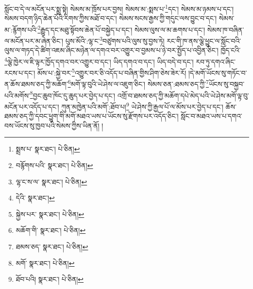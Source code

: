 སློང་བ་དེ་ལ་མངོན་པར་སྨྲ་སྟེ། སེམས་མ་ཁྲོས་པར་བྱས། སེམས་མ་:སྨས་པ་\footnote{སྨྲས་པ་  སྣར་ཐང་།  པེ་ཅིན། }དང་། སེམས་མ་ཉམས་པ་དང་། སེམས་བདག་ཉིད་ཆེན་པོའི་རིགས་ཀྱིས་མཐོ་བ་དང་། སེམས་སངས་རྒྱས་ཀྱི་གདུང་ལས་བྱུང་བ་དང་། སེམས་མ་:རྙོགས་པའི་\footnote{བརྙོགས་པའི་  སྣར་ཐང་།  པེ་ཅིན། }རྒྱུད་དང་མཐུ་སྟོབས་ཆེན་པོ་བསྐྱེད་པ་དང་། སེམས་ལུས་ལ་མ་ཆགས་པ་དང་། སེམས་ཁ་བཞིན་ལ་མངོན་པར་མ་ཞེན་ཅིང་། པུས་མོའི་:ལྷ་ང་\footnote{ལྷ་ང་ས་ལ་  སྣར་ཐང་།  པེ་ཅིན། }བཙུགས་པའི་ལུས་སུ་བྱས་ཏེ། རང་གི་ཁ་ནས་ལྕེ་ཕྱུང་ལ་སློང་བའི་ལུས་ལ་གཏད་དེ་ཚིག་འཇམ་ཞིང་མཉེན་ལ་དགའ་བར་འགྱུར་བ་བྱམས་པ་ཉེ་བར་སྤྱོད་པ་འབྱིན་ཅིང་། ཁྱོད་ངའི་\footnote{དེའི་  སྣར་ཐང་། }ལྕེ་ཁྱེར་ལ་ཇི་ལྟར་ཁྱོད་དགའ་བར་འགྱུར་བ་དང་། ཡིད་དགའ་བ་དང་། ཡིད་བདེ་བ་དང་། རབ་ཏུ་དགའ་ཞིང་རངས་པ་དང་། མོས་པ་:སྐྱེ་བར་\footnote{སྐྱེས་པར་  སྣར་ཐང་།  པེ་ཅིན། }འགྱུར་བར་ཅི་འདོད་པ་བཞིན་གྱིས་ཤིག་ཅེས་ཟེར་རོ། །དེ་མགོ་ཡོངས་སུ་གཏོང་བ་ན་ཆོས་ཐམས་ཅད་ཀྱི་མཆོག་\footnote{མཆོག་གི་  སྣར་ཐང་།  པེ་ཅིན། }མགོ་ལྟ་བུའི་ཡེ་ཤེས་ལ་འཇུག་ཅིང་། སེམས་ཅན་:ཐམས་ཅད་ཀྱི་\footnote{ཐམས་ཅད་  སྣར་ཐང་།  པེ་ཅིན། }ཡོངས་སུ་བསྐྱབ་པའི་མགོས་\footnote{མགོ་  སྣར་ཐང་།  པེ་ཅིན། }བྱང་ཆུབ་ཁོང་དུ་ཆུད་པར་བྱེད་པ་དང་། འགྲོ་བ་ཐམས་ཅད་ཀྱི་མཆོག་དཔེ་མེད་པའི་ཡེ་ཤེས་མགོ་ལྟ་བུ་མངོན་པར་འདོད་པ་དང་། ཀུན་མཁྱེན་པའི་མགོ་:ཐོབ་པ།\footnote{ཐོབ་པའི།  སྣར་ཐང་།  པེ་ཅིན། } ཡེ་ཤེས་ཀྱི་རྒྱལ་པོ་ལ་མོས་པར་བྱེད་པ་དང་། ཆོས་ཐམས་ཅད་ཀྱི་དབང་ཕྱུག་གི་མགོ་མཐའ་ཡས་པ་ཡོངས་སུ་རྫོགས་པར་འདོད་ཅིང་། སློང་བ་མཐའ་ཡས་པ་དགའ་བས་ཡོངས་སུ་ཁྱབ་པའི་སེམས་ཀྱིས་ཡིན་ནོ། །
